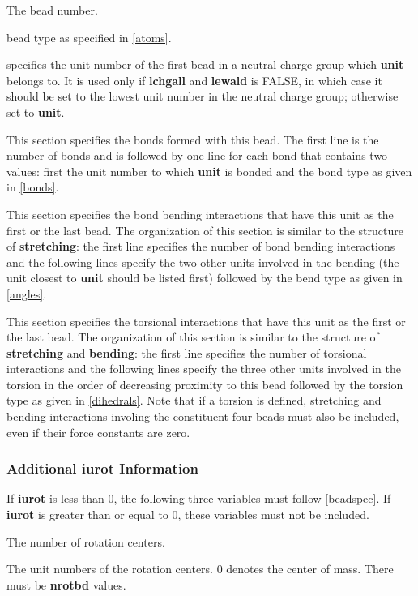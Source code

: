 \documentclass[12pt,letterpaper]{article}
\begin{document}
 The bead number.

 bead type as specified in \ref{atoms}.

 specifies the unit number of the
first bead in a neutral charge group which {\bf unit}
belongs to. It is used only if {\bf lchgall} and {\bf
  lewald} is FALSE, in which case it should be set to the
lowest unit number in the neutral charge group; otherwise
set to {\bf unit}.

 This section specifies the bonds
formed with this bead. The first line is the number of bonds
and is followed by one line for each bond that contains two
values: first the unit number to which {\bf unit} is bonded
and the bond type as given in \ref{bonds}.

 This section specifies the bond
bending interactions that have this unit as the first or the
last bead. The organization of this section is similar to
the structure of {\bf stretching}: the first line specifies
the number of bond bending interactions and the following
lines specify the two other units involved in the bending
(the unit closest to {\bf unit} should be listed first)
followed by the bend type as given in \ref{angles}.

 This section specifies the torsional
interactions that have this unit as the first or the last
bead. The organization of this section is similar to the
structure of {\bf stretching} and {\bf bending}: the first
line specifies the number of torsional interactions and the
following lines specify the three other units involved in
the torsion in the order of decreasing proximity to this
bead followed by the torsion type as given in
\ref{dihedrals}. Note that if a torsion is defined,
stretching and bending interactions involing the constituent
four beads must also be included, even if their force
constants are zero.

\subsubsection{Additional {\bf iurot} Information}
If {\bf iurot} is less than 0, the following three variables
must follow \ref{beadspec}. If {\bf iurot} is greater than
or equal to 0, these variables must not be included.

 The number of rotation centers.

 The unit numbers of the rotation
centers. 0 denotes the center of mass. There must be {\bf
  nrotbd} values.
\end{document}
